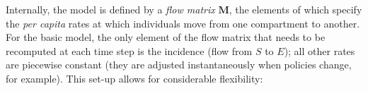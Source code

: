 \documentclass[12pt]{article}\usepackage[]{graphicx}\usepackage[]{color}
\begin{document}


Internally, the model is defined by a \emph{flow matrix} $\mathbf{M}$, the elements of which specify the \emph{per capita} rates at which individuals move from one compartment to another.
For the basic model, the only element of the flow matrix that needs to be recomputed at each time step is the incidence (flow from $S$ to $E$); all other rates are piecewise constant (they are adjusted instantaneously when policies change, for example).
This set-up allows for considerable flexibility:
\end{document}
